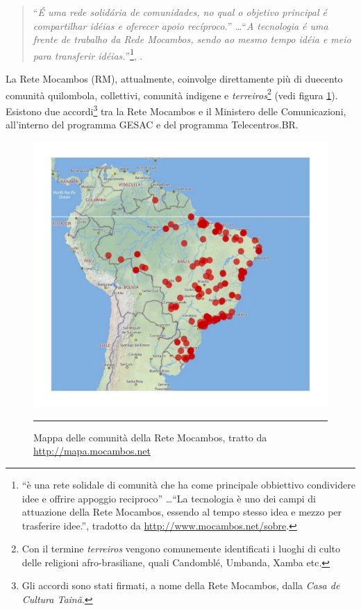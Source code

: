 \begin{quote}
  ``\emph{É uma rede solidária de comunidades, no qual o objetivo
    principal é compartilhar idéias e oferecer apoio recíproco.}''
  \ldots ``\emph{A tecnologia é uma frente de trabalho da Rede
    Mocambos, sendo ao mesmo tempo idéia e meio para transferir
    idéias.}''\footnote{``è una rete solidale di comunità che ha come
    principale obbiettivo condividere idee e offrire appoggio
    reciproco'' \ldots ``La tecnologia è uno dei campi di attuazione
    della Rete Mocambos, essendo al tempo stesso idea e mezzo per
    trasferire idee.'', tradotto da
    \url{http://www.mocambos.net/sobre}.}, \citep{RMSobre}.
\end{quote}

La Rete Mocambos (RM), attualmente, coinvolge direttamente più di
duecento comunità quilombola, collettivi, comunità indigene e
\emph{terreiros}\footnote{Con il termine \emph{terreiros} vengono
  comunemente identificati i luoghi di culto delle religioni
  afro-brasiliane, quali Candomblé, Umbanda, Xamba etc.} (vedi figura
\ref{fig:MappaRedeMocambos}). Esistono due accordi\footnote{Gli
  accordi sono stati firmati, a nome della Rete Mocambos, dalla
  \emph{Casa de Cultura Tainã}.} tra la Rete Mocambos e il Ministero
delle Comunicazioni, all'interno del programma GESAC e del programma
Telecentros.BR.

\begin{figure}[htbp]
  \centering
  \includegraphics[width=\textwidth]{./Figure/MappaRedeMocambos.pdf}
  \rule{35em}{0.5pt}
  \caption[Mappa delle comunità della Rete Mocambos, tratto da
  \url{http://mapa.mocambos.net}]{Mappa delle comunità della Rete
    Mocambos, tratto da \url{http://mapa.mocambos.net}}
  \label{fig:MappaRedeMocambos}
\end{figure}

